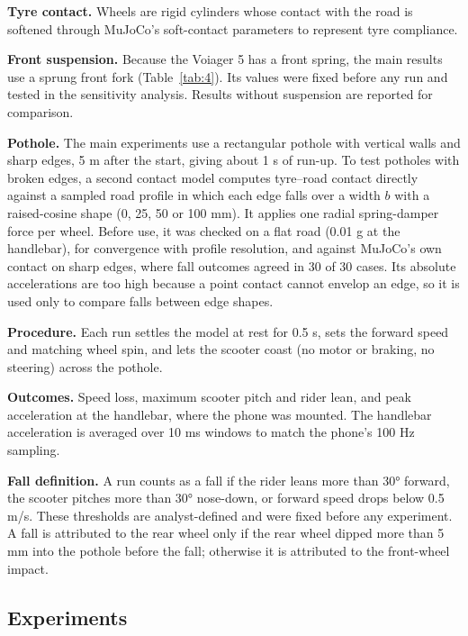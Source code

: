 \textbf{Tyre contact.} Wheels are rigid cylinders whose contact with the road is softened
through MuJoCo's soft-contact parameters to represent tyre compliance.

\textbf{Front suspension.} Because the Voiager 5 has a front spring, the main results use a
sprung front fork (Table~\ref{tab:4}). Its values were fixed before any run and tested in the
sensitivity analysis. Results without suspension are reported for comparison.

\textbf{Pothole.} The main experiments use a rectangular pothole with vertical walls and sharp
edges, 5 m after the start, giving about 1 s of run-up. To test potholes with broken
edges, a second contact model computes tyre--road contact directly against a sampled road
profile in which each edge falls over a width \(b\) with a raised-cosine shape (0, 25, 50 or
100 mm). It applies one radial spring-damper force per wheel. Before use, it was checked
on a flat road (0.01 g at the handlebar), for convergence with profile resolution, and
against MuJoCo's own contact on sharp edges, where fall outcomes agreed in 30 of 30 cases.
Its absolute accelerations are too high because a point contact cannot envelop an edge,
so it is used only to compare falls between edge shapes.

\textbf{Procedure.} Each run settles the model at rest for 0.5 s, sets the forward speed and
matching wheel spin, and lets the scooter coast (no motor or braking, no steering)
across the pothole.

\textbf{Outcomes.} Speed loss, maximum scooter pitch and rider lean, and peak acceleration at
the handlebar, where the phone was mounted. The handlebar acceleration is averaged over
10 ms windows to match the phone's 100 Hz sampling.

\textbf{Fall definition.} A run counts as a fall if the rider leans more than 30° forward,
the scooter pitches more than 30° nose-down, or forward speed drops below 0.5 m/s. These
thresholds are analyst-defined and were fixed before any experiment. A fall is attributed
to the rear wheel only if the rear wheel dipped more than 5 mm into the pothole before
the fall; otherwise it is attributed to the front-wheel impact.

\subsection{Experiments}\label{experiments}

